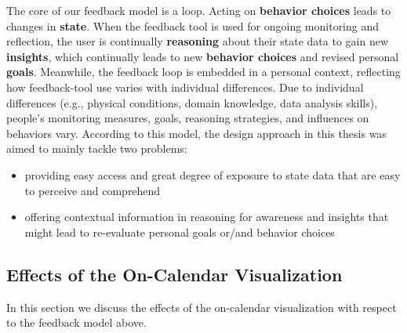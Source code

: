 \documentclass[12pt,oneside]{book}
\begin{document}
The core of our feedback model is a loop. Acting on \textbf{behavior choices} leads to changes in \textbf{state}. When the feedback tool is used for ongoing monitoring and reflection, the user is continually \textbf{reasoning} about their state data to gain new \textbf{insights}, which continually leads to new \textbf{behavior choices} and revised personal \textbf{goals}. Meanwhile, the feedback loop is embedded in a personal context, reflecting how feedback-tool use varies with individual differences. Due to individual differences (e.g., physical conditions, domain knowledge, data analysis skills), people's monitoring measures, goals, reasoning strategies, and influences on behaviors vary. According to this model, the design approach in this thesis was aimed to mainly tackle two problems:
\begin{itemize}
\item{providing easy access and great degree of exposure to state data that are easy to perceive and comprehend}
\item{offering contextual information in reasoning for awareness and insights that might lead to re-evaluate personal goals or/and behavior choices}
\end{itemize}

\subsection{Effects of the On-Calendar Visualization}
In this section we discuss the effects of the on-calendar visualization with respect to the feedback model above. 
\end{document}
